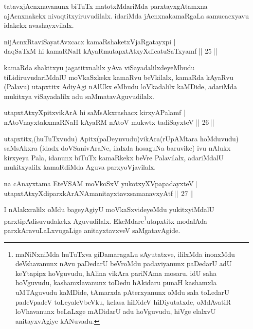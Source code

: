 \begin{artha}
tatavxjAcnxnavanunx biTuTx matotxMdariMda parxtayxgAtamxna ajAcnxnakekx nivaqtitxyiruvudilalx. idariMda jAcnxnakamaRgaLa samucacxyavu idakekx avashayxvilalx.
\end{artha}

\begin{shl}
nijAcnxRtaviSayatAvxcacx kamaRshaketxVjaRgatayxpi |\\
daqSaTxM hi kamaRNaH kAyaRmutapxtAtxyXdicatuSaTxyamf \hfill || 25 ||
\end{shl}

\begin{artha}
kamaRda shakitxyu jagatitxnalilx yAva viSayadalilxdeyeMbudu tiLidiruvudariMdalU moVkaSxkekx kamaRvu beVkilalx, kamaRda kAyaRvu (Palavu) utapxtitx AdiyAgi nAlUkx eMbudu loVkadalilx kaMDide, adariMda mukitxya viSayadalilx adu saMmatavAguvudilalx.
\end{artha}


\begin{shl}
utapxtAtxyXpitxvikArA hi saMsAkxrashacx kirxyAPalamf |\\
nAtoV\s nayxtakxmaRNaH kAyaRM nAtoV mukwtx tadiSayxteV \hfill || 26 ||
\end{shl}

\begin{artha}
utapxtitx,(huTuTxvudu) Apitx(paDeyuvudu)vikAra(rUpAMtara hoMduvudu) saMsAkxra (idadx doVSanivAraNe, ilalxda hosaguNa baruvike) ivu nAlukx kirxyeya Pala, idanunx biTuTx kamaRkekx beVre Palavilalx, adariMdalU mukitxyalilx kamaRdiMda Aguva parxyoVjavilalx.
\end{artha}

\begin{shl}
na cAnayxtama EteVSAM moVkoSxV yukotxyXVpapadayxteV |\\
utapxtAtxyXdiparxkArANAmanitayxtavxsamanavxyAtf \hfill ||  27 ||
\end{shl}

\begin{artha}
I nAlakxralilx oMdu bageyAgiyU moVkaSxvideyeMdu yukitxyiMdalU parxtipAdisuvudakekx Aguvudilalx. EkeMdare\footnote{maNiNxniMda huTuTxva giDamaragaLu sAyutatxve, ililxMda inonxMdu deVshavanunx nAvu paDedarU beVroMdu padaviyanunx paDedarU adU keYtapipx hoVguvudu, hAlina vikAra pariNAma mosaru. idU saha hoVguvudu, kashamxlavanunx toDedu hAkidaru punaH kashamxla uMTAguvudu kaMDide, tAmarxda pAterxyanunx oMdu sala toLedarU padeVpadeV toLeyaleVbeVku, kelasa hiDideV hiDiyutatxde, oMdAvatiR loVhavanunx beLaLxge mADidarU adu hoVguvudu, hiVge elalxvU anitayxvAgiye kANuvadu.}utapxtitx modalAda parxkAravuLaLxvugaLige anitayxtavxveV saMgatavAgide.
\end{artha}

